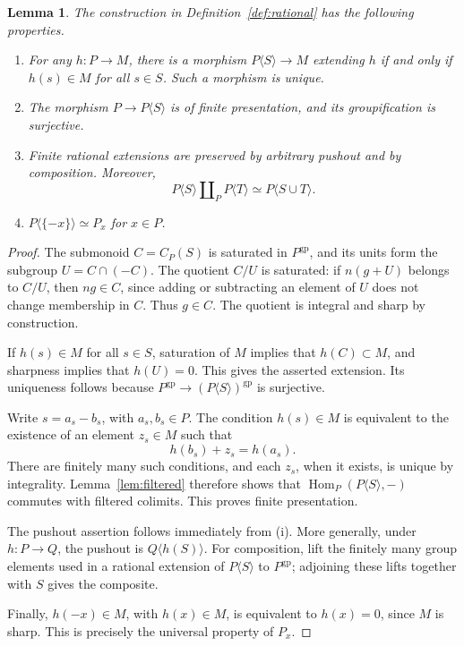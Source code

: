 \documentclass[11pt]{article}
\newtheorem{lemma}[theorem]{Lemma}
\theoremstyle{definition}
\theoremstyle{remark}
\DeclareMathOperator{\Hom}{Hom}
\newcommand{\gp}{\mathrm{gp}}
\begin{document}
\begin{lemma}\label{lem:rational}
The construction in Definition~\ref{def:rational} has the following
properties.
\begin{enumerate}[label=\textup{(\roman*)}]
\item For any \(h:P\to M\), there is a morphism
\(P\langle S\rangle\to M\) extending \(h\) if and only if
\(h(s)\in M\) for all \(s\in S\). Such a morphism is unique.
\item The morphism \(P\to P\langle S\rangle\) is of finite
presentation, and its groupification is surjective.
\item Finite rational extensions are preserved by arbitrary
pushout and by composition. Moreover,
\[
P\langle S\rangle\amalg_P P\langle T\rangle
\simeq P\langle S\cup T\rangle.
\]
\item \(P\langle\{-x\}\rangle\simeq P_x\) for \(x\in P\).
\end{enumerate}
\end{lemma}

\begin{proof}
The submonoid \(C=C_P(S)\) is saturated in \(P^{\gp}\), and its units
form the subgroup \(U=C\cap(-C)\). The quotient \(C/U\) is saturated:
if \(n(g+U)\) belongs to \(C/U\), then \(ng\in C\), since adding or
subtracting an element of \(U\) does not change membership in \(C\).
Thus \(g\in C\). The quotient is integral and sharp by construction.

If \(h(s)\in M\) for all \(s\in S\), saturation of \(M\) implies that
\(h(C)\subset M\), and sharpness implies that \(h(U)=0\). This gives
the asserted extension. Its uniqueness follows because
\(P^{\gp}\to(P\langle S\rangle)^{\gp}\) is surjective.

Write \(s=a_s-b_s\), with \(a_s,b_s\in P\). The condition
\(h(s)\in M\) is equivalent to the existence of an element \(z_s\in M\)
such that
\[
h(b_s)+z_s=h(a_s).
\]
There are finitely many such conditions, and each \(z_s\), when it
exists, is unique by integrality. Lemma~\ref{lem:filtered} therefore
shows that
\(\Hom_P(P\langle S\rangle,-)\) commutes with filtered colimits.
This proves finite presentation.

The pushout assertion follows immediately from (i). More generally,
under \(h:P\to Q\), the pushout is
\(Q\langle h(S)\rangle\). For composition, lift the finitely many
group elements used in a rational extension of \(P\langle S\rangle\)
to \(P^{\gp}\); adjoining these lifts together with \(S\) gives the
composite.

Finally, \(h(-x)\in M\), with \(h(x)\in M\), is equivalent to
\(h(x)=0\), since \(M\) is sharp. This is precisely the universal
property of \(P_x\).
\end{proof}
\end{document}
